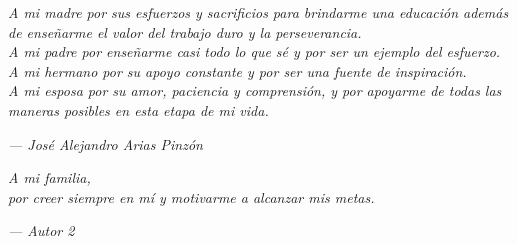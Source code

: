 \cleardoublepage
{}
{}
\thispagestyle{empty}

\vspace*{4cm}

\begin{center}
\textit{
    A mi madre por sus esfuerzos y sacrificios para brindarme una educación además de enseñarme el valor del trabajo duro y la perseverancia. \\
    A mi padre por enseñarme casi todo lo que sé y por ser un ejemplo del esfuerzo. \\
    A mi hermano por su apoyo constante y por ser una fuente de inspiración.\\
    A mi esposa por su amor, paciencia y comprensión, y por apoyarme de todas las maneras posibles en esta etapa de mi vida.\\
}

\vspace{2cm}

\hfill \textit{--- José Alejandro Arias Pinzón}

\vspace{3cm}

\textit{
A mi familia,\\
por creer siempre en mí y motivarme a alcanzar mis metas.
}

\vspace{2cm}

\hfill \textit{--- Autor 2}
\end{center}
